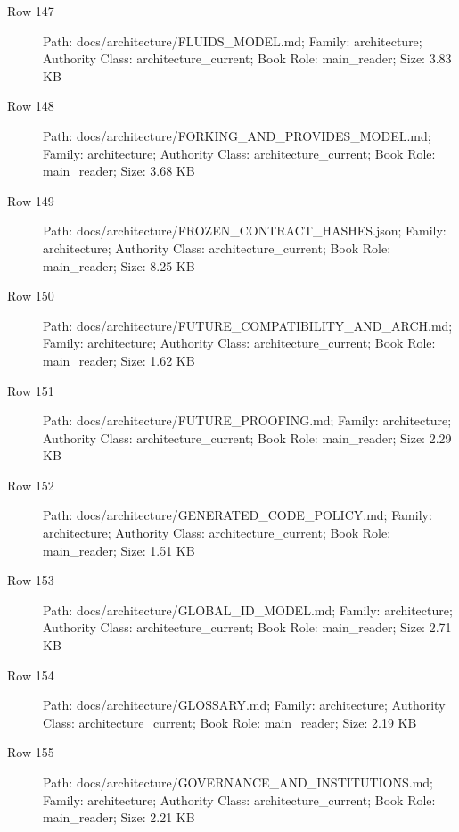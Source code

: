 \documentclass[9pt,a4paper]{book}
\begin{document}
\begin{description}
\item[Row 147] Path: docs/\allowbreak{}architecture/\allowbreak{}FLUIDS\_\allowbreak{}MODEL.\allowbreak{}md; Family: architecture; Authority Class: architecture\_\allowbreak{}current; Book Role: main\_\allowbreak{}reader; Size: 3.\allowbreak{}83 KB
\item[Row 148] Path: docs/\allowbreak{}architecture/\allowbreak{}FORKING\_\allowbreak{}AND\_\allowbreak{}PROVIDES\_\allowbreak{}MODEL.\allowbreak{}md; Family: architecture; Authority Class: architecture\_\allowbreak{}current; Book Role: main\_\allowbreak{}reader; Size: 3.\allowbreak{}68 KB
\item[Row 149] Path: docs/\allowbreak{}architecture/\allowbreak{}FROZEN\_\allowbreak{}CONTRACT\_\allowbreak{}HASHES.\allowbreak{}json; Family: architecture; Authority Class: architecture\_\allowbreak{}current; Book Role: main\_\allowbreak{}reader; Size: 8.\allowbreak{}25 KB
\item[Row 150] Path: docs/\allowbreak{}architecture/\allowbreak{}FUTURE\_\allowbreak{}COMPATIBILITY\_\allowbreak{}AND\_\allowbreak{}ARCH.\allowbreak{}md; Family: architecture; Authority Class: architecture\_\allowbreak{}current; Book Role: main\_\allowbreak{}reader; Size: 1.\allowbreak{}62 KB
\item[Row 151] Path: docs/\allowbreak{}architecture/\allowbreak{}FUTURE\_\allowbreak{}PROOFING.\allowbreak{}md; Family: architecture; Authority Class: architecture\_\allowbreak{}current; Book Role: main\_\allowbreak{}reader; Size: 2.\allowbreak{}29 KB
\item[Row 152] Path: docs/\allowbreak{}architecture/\allowbreak{}GENERATED\_\allowbreak{}CODE\_\allowbreak{}POLICY.\allowbreak{}md; Family: architecture; Authority Class: architecture\_\allowbreak{}current; Book Role: main\_\allowbreak{}reader; Size: 1.\allowbreak{}51 KB
\item[Row 153] Path: docs/\allowbreak{}architecture/\allowbreak{}GLOBAL\_\allowbreak{}ID\_\allowbreak{}MODEL.\allowbreak{}md; Family: architecture; Authority Class: architecture\_\allowbreak{}current; Book Role: main\_\allowbreak{}reader; Size: 2.\allowbreak{}71 KB
\item[Row 154] Path: docs/\allowbreak{}architecture/\allowbreak{}GLOSSARY.\allowbreak{}md; Family: architecture; Authority Class: architecture\_\allowbreak{}current; Book Role: main\_\allowbreak{}reader; Size: 2.\allowbreak{}19 KB
\item[Row 155] Path: docs/\allowbreak{}architecture/\allowbreak{}GOVERNANCE\_\allowbreak{}AND\_\allowbreak{}INSTITUTIONS.\allowbreak{}md; Family: architecture; Authority Class: architecture\_\allowbreak{}current; Book Role: main\_\allowbreak{}reader; Size: 2.\allowbreak{}21 KB

\end{description}
\end{document}
